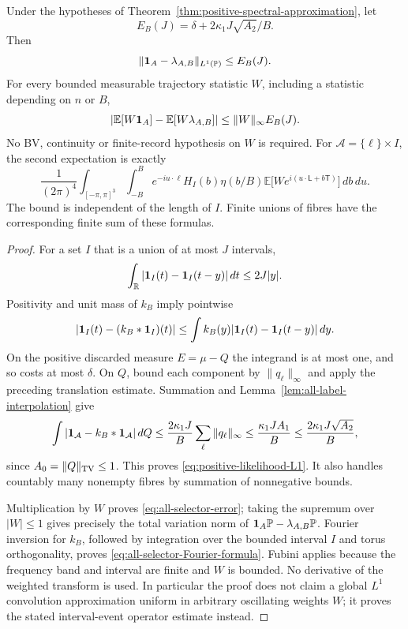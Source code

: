 \begin{theorem}
\label{thm:all-selector-finite-band}
Under the hypotheses of Theorem~\ref{thm:positive-spectral-approximation},
let
\begin{equation}\label{eq:positive-event-error-budget}
 E_B(J)=\delta+2\kappa_1J\sqrt{A_2}/B.
\end{equation}
Then
\begin{equation}\label{eq:positive-likelihood-L1}
 \|\one_A-\lambda_{A,B}\|_{L^1(\mathbb P)}\le E_B(J).
\end{equation}
For every bounded measurable trajectory statistic $W$, including a
statistic depending on $n$ or $B$,
\begin{equation}\label{eq:all-selector-error}
 \left|\mathbb E[W\one_A]-\mathbb E[W\lambda_{A,B}]\right|
                               \le\|W\|_\infty E_B(J).
\end{equation}
No BV, continuity or finite-record hypothesis on $W$ is required.
For $\mathcal A=\{\ell\}\times I$, the second expectation is exactly
\begin{equation}\label{eq:all-selector-Fourier-formula}
 \frac1{(2\pi)^4}\int_{[-\pi,\pi]^3}\int_{-B}^B
 e^{-iu\cdot\ell}H_I(b)\eta(b/B)
          \mathbb E\bigl[W e^{i(u\cdot\mathsf L+b\mathsf T)}\bigr]
                                                        \,db\,du.
\end{equation}
The bound is independent of the length of $I$. Finite unions of fibres
have the corresponding finite sum of these formulas.
\end{theorem}
\begin{proof}
For a set $I$ that is a union of at most $J$ intervals,
\[
 \int_\mathbb R|\mathbf1_I(t)-\mathbf1_I(t-y)|\,dt\le2J|y|.
\]
Positivity and unit mass of $k_B$ imply pointwise
\[
 |\mathbf1_I(t)-(k_B*\mathbf1_I)(t)|
    \le\int k_B(y)|\mathbf1_I(t)-\mathbf1_I(t-y)|\,dy.
\]
On the positive discarded measure $E=\mu-Q$ the integrand is at most
one, and so costs at most $\delta$. On $Q$, bound each component by
$\|q_\ell\|_\infty$ and apply the preceding translation estimate.
Summation and Lemma~\ref{lem:all-label-interpolation} give
\[
 \int|\mathbf1_{\mathcal A}-k_B*\mathbf1_{\mathcal A}|\,dQ
   \le\frac{2\kappa_1J}{B}\sum_\ell\|q_\ell\|_\infty
   \le\frac{\kappa_1J A_1}{B}
   \le\frac{2\kappa_1J\sqrt{A_2}}B,
\]
since $A_0=\|Q\|_{\operatorname{TV}}\le1$. This proves
\eqref{eq:positive-likelihood-L1}. It also handles countably many
nonempty fibres by summation of nonnegative bounds.

Multiplication by $W$ proves \eqref{eq:all-selector-error}; taking the
supremum over $|W|\le1$ gives precisely the total variation norm of
$\mathbf1_A\mathbb P-\lambda_{A,B}\mathbb P$.
Fourier inversion for $k_B$, followed by integration over the bounded
interval $I$ and torus orthogonality, proves
\eqref{eq:all-selector-Fourier-formula}. Fubini applies because the
frequency band and interval are finite and $W$ is bounded.
No derivative of the weighted transform is used. In particular the
proof does not claim a global $L^1$ convolution approximation uniform
in arbitrary oscillating weights $W$; it proves the stated interval-event
operator estimate instead.
\end{proof}

